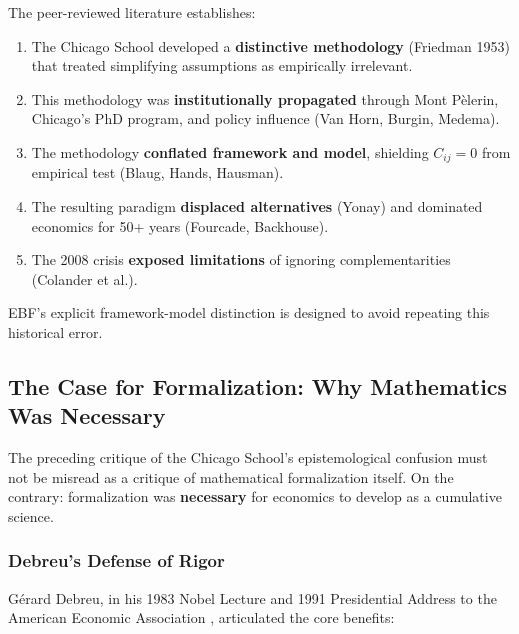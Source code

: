 The peer-reviewed literature establishes:

\begin{enumerate}[nosep]
    \item The Chicago School developed a \textbf{distinctive methodology} (Friedman 1953)
        that treated simplifying assumptions as empirically irrelevant.
    \item This methodology was \textbf{institutionally propagated} through Mont P\`{e}lerin,
        Chicago's PhD program, and policy influence (Van Horn, Burgin, Medema).
    \item The methodology \textbf{conflated framework and model}, shielding $C_{ij} = 0$
        from empirical test (Blaug, Hands, Hausman).
    \item The resulting paradigm \textbf{displaced alternatives} (Yonay) and dominated
        economics for 50+ years (Fourcade, Backhouse).
    \item The 2008 crisis \textbf{exposed limitations} of ignoring complementarities
        (Colander et al.).
\end{enumerate}

EBF's explicit framework-model distinction is designed to avoid repeating this
historical error.



\subsection{The Case for Formalization: Why Mathematics Was Necessary}
\label{sec:meta-formalization}

The preceding critique of the Chicago School's epistemological confusion must not be
misread as a critique of mathematical formalization itself. On the contrary: formalization
was \textbf{necessary} for economics to develop as a cumulative science.

\subsubsection{Debreu's Defense of Rigor}

G\'{e}rard Debreu, in his 1983 Nobel Lecture and 1991 Presidential Address to the
American Economic Association \citep{debreu1984economic,debreu1991mathematization}, articulated the core benefits:

